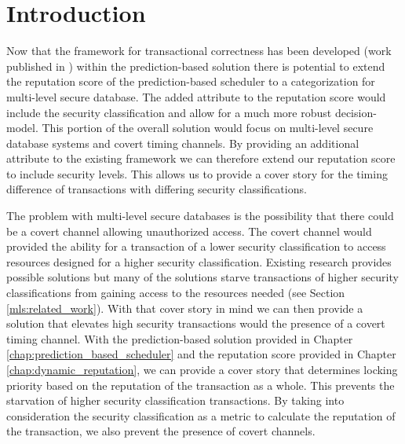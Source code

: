 \section{Introduction}
\label{mls:introduction}

Now that the framework for transactional correctness has been developed (work published in \cite{ravan_ensuring_2020}) within the prediction-based solution there is potential to extend the reputation score of the prediction-based scheduler to a categorization for multi-level secure database. The added attribute to the reputation score would include the security classification and allow for a much more robust decision-model. This portion of the overall solution would focus on multi-level secure database systems and covert timing channels. By providing an additional attribute to the existing framework we can therefore extend our reputation score to include security levels. This allows us to provide a cover story for the timing difference of transactions with differing security classifications. 

The problem with multi-level secure databases is the possibility that there could be a covert channel allowing unauthorized access. The covert channel would provided the ability for a transaction of a lower security classification to access resources designed for a higher security classification. Existing research provides possible solutions but many of the solutions starve transactions of higher security classifications from gaining access to the resources needed (see Section \ref{mls:related_work}). With that cover story in mind we can then provide a solution that elevates high security transactions would the presence of a covert timing channel. With the prediction-based solution provided in Chapter \ref{chap:prediction_based_scheduler} and the reputation score provided in Chapter \ref{chap:dynamic_reputation}, we can provide a cover story that determines locking priority based on the reputation of the transaction as a whole. This prevents the starvation of higher security classification transactions. By taking into consideration the security classification as a metric to calculate the reputation of the transaction, we also prevent the presence of covert channels. 